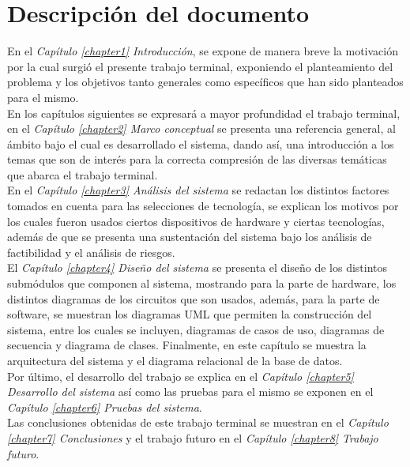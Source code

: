 \chapter*{Descripción del documento}
En el \textit{Capítulo \ref{chapter1} Introducción}, se expone de manera breve la motivación por la cual surgió el presente trabajo terminal, exponiendo el planteamiento del problema y los objetivos tanto generales como específicos que han sido planteados para el mismo.\\
En los capítulos siguientes se expresará a mayor profundidad el trabajo terminal, en el \textit{Capítulo \ref{chapter2} Marco conceptual} se presenta una referencia general, al ámbito bajo el cual es desarrollado el sistema, dando así, una introducción a los temas que son de interés para la correcta compresión de las diversas temáticas que abarca el trabajo terminal.\\
En el \textit{Capítulo \ref{chapter3} Análisis del sistema} se redactan los distintos factores tomados en cuenta para las selecciones de tecnología, se explican los motivos por los cuales fueron usados ciertos dispositivos de hardware y ciertas tecnologías, además de que se presenta una sustentación del sistema bajo los análisis de factibilidad y el análisis de riesgos.\\
El \textit{Capítulo \ref{chapter4} Diseño del sistema} se presenta el diseño de los distintos submódulos que componen al sistema, mostrando para la parte de hardware, los distintos diagramas de los circuitos que son usados, además, para la parte de software, se muestran los diagramas UML que permiten la construcción del sistema, entre los cuales se incluyen, diagramas de casos de uso, diagramas de secuencia y diagrama de clases. Finalmente, en este capítulo se muestra la arquitectura del sistema y el diagrama relacional de la base de datos.\\
Por último, el desarrollo del trabajo se explica en el \textit{Capítulo \ref{chapter5} Desarrollo del sistema} así como las pruebas para el mismo se exponen en el \textit{Capítulo \ref{chapter6} Pruebas del sistema}.\\
Las conclusiones obtenidas de este trabajo terminal se muestran en el \textit{Capítulo \ref{chapter7} Conclusiones} y el trabajo futuro en el \textit{Capítulo \ref{chapter8} Trabajo futuro}.\\
